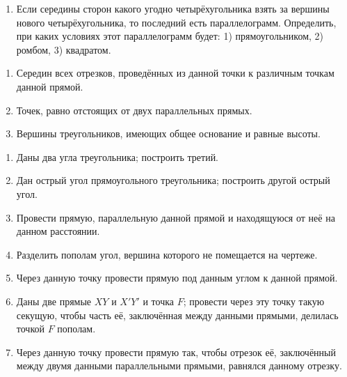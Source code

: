 {\begin{enumerate}[noitemsep]
\item
Если середины сторон какого угодно четырёхугольника взять за вершины нового четырёхугольника, то последний есть параллелограмм.
Определить, при каких условиях этот параллелограмм будет:
1) прямоугольником, 2) ромбом, 3) квадратом.

\end{enumerate}

\begin{center}
\end{center}

\begin{enumerate}[noitemsep]


\item
Середин всех отрезков, проведённых из данной точки к различным точкам данной прямой.

\item
Точек, равно отстоящих от двух параллельных прямых.

\item
Вершины треугольников, имеющих общее основание и равные высоты.
\end{enumerate}
\begin{center}
\end{center}

\begin{enumerate}

\item
Даны два угла треугольника;
построить третий.

\item
Дан острый угол прямоугольного треугольника;
построить другой острый угол.

\item
Провести прямую, параллельную данной прямой и находящуюся от неё на данном расстоянии.

\item
Разделить пополам угол, вершина которого не помещается на чертеже.

\item
Через данную точку провести прямую под данным углом к данной прямой.

\item
Даны две прямые $XY$ и $X'Y'$ и точка $F$;
провести через эту точку такую секущую, чтобы часть её, заключённая между данными прямыми, делилась точкой $F$ пополам.

\item
Через данную точку провести прямую так, чтобы отрезок её, заключённый между двумя данными параллельными прямыми, равнялся данному отрезку.


\end{enumerate}}
